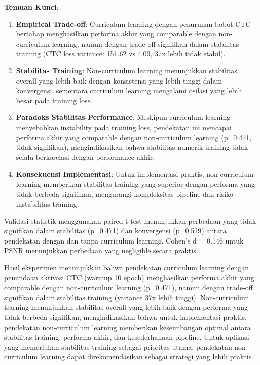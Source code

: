 \documentclass[12pt,a4paper]{article}
\begin{document}
\textbf{Temuan Kunci}:
\begin{enumerate}
    \item \textbf{Empirical Trade-off}: Curriculum learning dengan penurunan bobot CTC bertahap menghasilkan performa akhir yang comparable dengan non-curriculum learning, namun dengan trade-off signifikan dalam stabilitas training (CTC loss variance: 151.62 vs 4.09, 37x lebih tidak stabil).
    \item \textbf{Stabilitas Training}: Non-curriculum learning menunjukkan stabilitas overall yang lebih baik dengan konsistensi yang lebih tinggi dalam konvergensi, sementara curriculum learning mengalami osilasi yang lebih besar pada training loss.
    \item \textbf{Paradoks Stabilitas-Performance}: Meskipun curriculum learning menyebabkan instability pada training loss, pendekatan ini mencapai performa akhir yang comparable dengan non-curriculum learning (p=0.471, tidak signifikan), mengindikasikan bahwa stabilitas numerik training tidak selalu berkorelasi dengan performance akhir.
    \item \textbf{Konsekuensi Implementasi}: Untuk implementasi praktis, non-curriculum learning memberikan stabilitas training yang superior dengan performa yang tidak berbeda signifikan, mengurangi kompleksitas pipeline dan risiko instabilitas training.
\end{enumerate}

Validasi statistik menggunakan paired t-test menunjukkan perbedaan yang tidak signifikan dalam stabilitas (p=0.471) dan konvergensi (p=0.519) antara pendekatan dengan dan tanpa curriculum learning. Cohen's d = 0.146 untuk PSNR menunjukkan perbedaan yang negligible secara praktis.

Hasil eksperimen menunjukkan bahwa pendekatan curriculum learning dengan penundaan aktivasi CTC (warmup 10 epoch) menghasilkan performa akhir yang comparable dengan non-curriculum learning (p=0.471), namun dengan trade-off signifikan dalam stabilitas training (variance 37x lebih tinggi). Non-curriculum learning menunjukkan stabilitas overall yang lebih baik dengan performa yang tidak berbeda signifikan, mengindikasikan bahwa untuk implementasi praktis, pendekatan non-curriculum learning memberikan keseimbangan optimal antara stabilitas training, performa akhir, dan kesederhanaan pipeline. Untuk aplikasi yang memerlukan stabilitas training sebagai prioritas utama, pendekatan non-curriculum learning dapat direkomendasikan sebagai strategi yang lebih praktis.
\end{document}
